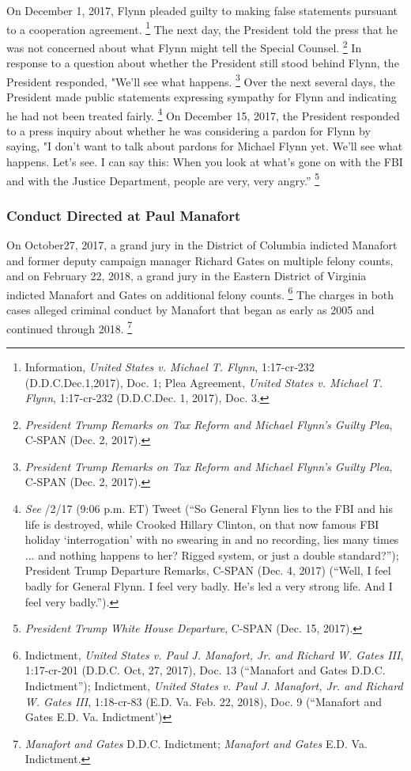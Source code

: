 {On December 1, 2017, Flynn pleaded guilty to making false statements pursuant to a cooperation agreement.%
\footnote{Information, \textit{United States v. Michael T. Flynn}, 1:17-cr-232 (D.D.C.Dec.1,2017), Doc. 1;
Plea Agreement, \textit{United States v. Michael T. Flynn}, 1:17-cr-232 (D.D.C.Dec. 1, 2017), Doc. 3.}
The next day, the President told the press that he was not concerned about what Flynn might tell the Special Counsel.%
\footnote{\textit{President Trump Remarks on Tax Reform and Michael Flynn’s Guilty Plea}, C-SPAN (Dec. 2, 2017).}
In response to a question about whether the President still stood behind Flynn, the President responded, "We'll see what happens.%
\footnote{\textit{President Trump Remarks on Tax Reform and Michael Flynn’s Guilty Plea}, C-SPAN (Dec. 2, 2017).}
Over the next several days, the President made public statements expressing sympathy for Flynn and indicating he had not been treated fairly.%
\footnote{\textit{See} /2/17 (9:06 p.m. ET) Tweet (“So General Flynn lies to the FBI and his life is destroyed, while Crooked Hillary Clinton, on that now famous FBI holiday ‘interrogation’ with no swearing in and no recording, lies many times ... and nothing happens to her?
Rigged system, or just a double standard?”);
President Trump Departure Remarks, C-SPAN (Dec. 4, 2017) (“Well, I feel badly for General Flynn.
I feel very badly.
He’s led a very strong life.
And I feel very badly.”).}
On December 15, 2017, the President responded to a press inquiry about whether he was considering a pardon for Flynn by saying, "I don't want to talk about pardons for Michael Flynn yet.
We'll see what happens.
Let's see.
I can say this: When you look at what's gone on with the FBI and with the Justice Department, people are very, very angry.''%
\footnote{\textit{President Trump White House Departure}, C-SPAN (Dec. 15, 2017).}

\subsubsection{Conduct Directed at Paul Manafort}

On October27, 2017, a grand jury in the District of Columbia indicted Manafort and former deputy campaign manager Richard Gates on multiple felony counts, and on February 22, 2018, a grand jury in the Eastern District of Virginia indicted Manafort and Gates on additional felony counts.%
\footnote{Indictment, \textit{United States v. Paul J. Manafort, Jr. and Richard W. Gates III}, 1:17-cr-201 (D.D.C. Oct, 27, 2017), Doc. 13 (“Manafort and Gates D.D.C. Indictment”);
Indictment, \textit{United States v. Paul J. Manafort, Jr. and Richard W. Gates III}, 1:18-cr-83 (E.D. Va. Feb. 22, 2018), Doc. 9 (“Manafort and Gates E.D. Va. Indictment’)}
The charges in both cases alleged criminal conduct by Manafort that began as early as 2005 and continued through 2018.%
\footnote{\textit{Manafort and Gates} D.D.C. Indictment; \textit{Manafort and Gates} E.D. Va. Indictment.}

}
